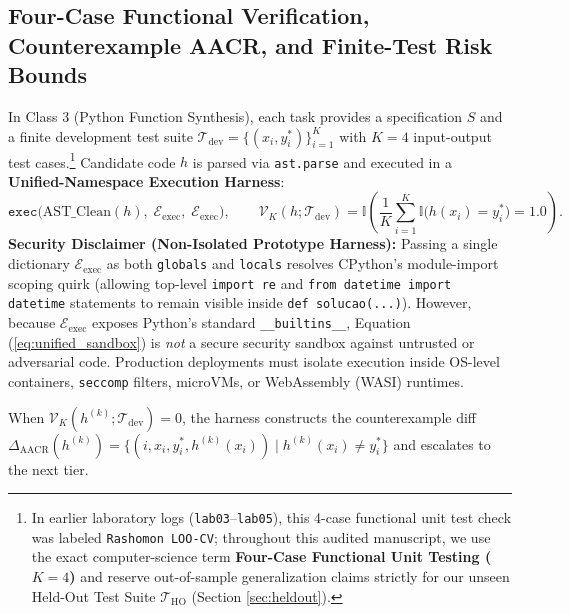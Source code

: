 \documentclass[10pt,a4paper]{article}
\begin{document}
\subsection{Four-Case Functional Verification, Counterexample AACR, and Finite-Test Risk Bounds}
\label{sec:math_rashomon}

In Class 3 (Python Function Synthesis), each task provides a specification $S$ and a finite development test suite $\mathcal{T}_{\text{dev}} = \{(x_i, y_i^*)\}_{i=1}^K$ with $K = 4$ input-output test cases.\footnote{In earlier laboratory logs (\texttt{lab03}--\texttt{lab05}), this 4-case functional unit test check was labeled \texttt{Rashomon LOO-CV}; throughout this audited manuscript, we use the exact computer-science term \textbf{Four-Case Functional Unit Testing ($K=4$)} and reserve out-of-sample generalization claims strictly for our unseen Held-Out Test Suite $\mathcal{T}_{\text{HO}}$ (Section \ref{sec:heldout}).} Candidate code $h$ is parsed via \texttt{ast.parse} and executed in a \textbf{Unified-Namespace Execution Harness}:
\begin{equation}
\label{eq:unified_sandbox}
\texttt{exec}\big(\text{AST\_Clean}(h),\; \mathcal{E}_{\text{exec}},\; \mathcal{E}_{\text{exec}}\big), \qquad \mathcal{V}_K(h; \mathcal{T}_{\text{dev}}) = \mathbb{I}\!\left(\frac{1}{K}\sum_{i=1}^K \mathbb{I}\big(h(x_i) = y_i^*\big) = 1.0\right).
\end{equation}
\textbf{Security Disclaimer (Non-Isolated Prototype Harness):} Passing a single dictionary $\mathcal{E}_{\text{exec}}$ as both \texttt{globals} and \texttt{locals} resolves CPython's module-import scoping quirk (allowing top-level \texttt{import re} and \texttt{from datetime import datetime} statements to remain visible inside \texttt{def solucao(...)}). However, because $\mathcal{E}_{\text{exec}}$ exposes Python's standard \texttt{\_\_builtins\_\_}, Equation (\ref{eq:unified_sandbox}) is \emph{not} a secure security sandbox against untrusted or adversarial code. Production deployments must isolate execution inside OS-level containers, \texttt{seccomp} filters, microVMs, or WebAssembly (WASI) runtimes.

When $\mathcal{V}_K(h^{(k)}; \mathcal{T}_{\text{dev}}) = 0$, the harness constructs the counterexample diff $\Delta_{\text{AACR}}(h^{(k)}) = \{(i, x_i, y_i^*, h^{(k)}(x_i)) \mid h^{(k)}(x_i) \neq y_i^*\}$ and escalates to the next tier.
\end{document}
